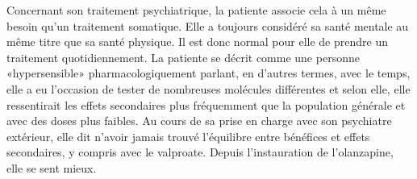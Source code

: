 Concernant son traitement psychiatrique, la patiente associe cela à un même besoin qu’un traitement somatique. Elle a toujours considéré sa santé mentale au même titre que sa santé physique. Il est donc normal pour elle de prendre un traitement quotidiennement. 
La patiente se décrit comme une personne «hypersensible» pharmacologiquement parlant, en d’autres termes, avec le temps, elle a eu l’occasion de tester de nombreuses molécules différentes et selon elle, elle ressentirait les effets secondaires plus fréquemment que la population générale et avec des doses plus faibles. Au cours de sa prise en charge avec son psychiatre extérieur, elle dit n’avoir jamais trouvé l’équilibre entre bénéfices et effets secondaires, y compris avec le valproate. Depuis l’instauration de l’olanzapine, elle se sent mieux. 
